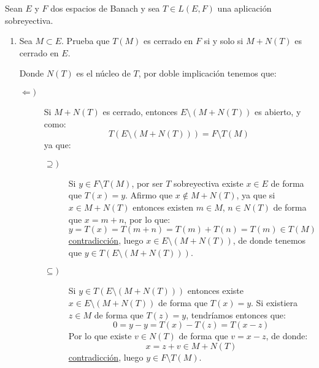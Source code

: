 \begin{ejercicio}
    Sean $E$ y $F$ dos espacios de Banach y sea $T\in L(E,F)$ una aplicación sobreyectiva.
    \begin{enumerate}
        \item Sea $M\subset E$. Prueba que $T(M)$ es cerrado en $F$ si y solo si $M+N(T)$ es cerrado en $E$.

            Donde $N(T)$ es el núcleo de $T$, por doble implicación tenemos que:
            \begin{description}
                \item [$\Longleftarrow )$] Si $M+N(T)$ es cerrado, entonces $E\setminus(M+N(T))$ es abierto, y como:
                    \begin{equation*}
                        T(E\setminus(M+N(T))) = F\setminus T(M)
                    \end{equation*}
                    ya que:
                    \begin{description}
                        \item [$\supseteq )$] Si $y\in F\setminus T(M)$, por ser $T$ sobreyectiva existe $x\in E$ de forma que $T(x) = y$. Afirmo que $x\notin M + N(T)$, ya que si $x\in M+N(T)$ entonces existen $m\in M$, $n\in N(T)$ de forma que $x = m+ n$, por lo que:
                            \begin{equation*}
                                y = T(x) = T(m+n) = T(m) + T(n) = T(m) \in T(M)
                            \end{equation*}
                            \underline{contradicción}, luego $x\in E\setminus(M+N(T))$, de donde tenemos que $y \in T(E\setminus (M+N(T)))$.
                        \item [$\subseteq )$] Si $y\in T(E\setminus(M+N(T)))$ entonces existe $x\in E\setminus(M+N(T))$ de forma que $T(x) = y$. Si existiera $z\in M$ de forma que $T(z) = y$, tendríamos entonces que:
                            \begin{equation*}
                                0 = y-y = T(x)-T(z) = T(x-z) 
                            \end{equation*}
                            Por lo que existe $v\in N(T)$ de forma que $v = x-z$, de donde:
                            \begin{equation*}
                                x = z+v \in M+N(T)
                            \end{equation*}
                            \underline{contradicción}, luego $y\in F\setminus T(M)$.

\end{description}
\end{description}
\end{enumerate}
\end{ejercicio}
